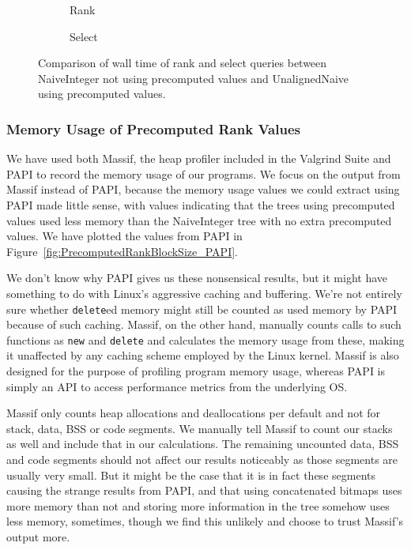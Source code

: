 \begin{figure}\tiny
	\begin{subfigure}{0.48\textwidth}
		
		\caption{Rank}
		\label{fig:PrecomputedRankBlockSize_vsNaiveInteger_Rank}
	\end{subfigure}
	\hfill
	\begin{subfigure}{0.48\textwidth}
		
		\caption{Select}
		\label{fig:PrecomputedRankBlockSize_vsNaiveInteger_Select}
	\end{subfigure}
	\caption{Comparison of wall time of rank and select queries between NaiveInteger not using precomputed values and UnalignedNaive using precomputed values.}
	\label{fig:PrecomputedRankBlockSize_vsNaiveInteger}
\end{figure}

\restoregeometry




\subsubsection{Memory Usage of Precomputed Rank Values}
We have used both Massif, the heap profiler included in the Valgrind Suite and PAPI to record the memory usage of our programs.
We focus on the output from Massif instead of PAPI, because the memory usage values we could extract using PAPI made little sense, with values indicating that the trees using precomputed values used less memory than the NaiveInteger tree with no extra precomputed values.
We have plotted the values from PAPI in Figure~\ref{fig:PrecomputedRankBlockSize_PAPI}.

We don't know why PAPI gives us these nonsensical results, but it might have something to do with Linux's aggressive caching and buffering.
We're not entirely sure whether \texttt{delete}ed memory might still be counted as used memory by PAPI because of such caching.
Massif, on the other hand, manually counts calls to such functions as \texttt{new} and \texttt{delete} and calculates the memory usage from these, making it unaffected by any caching scheme employed by the Linux kernel.
Massif is also designed for the purpose of profiling program memory usage, whereas PAPI is simply an API to access performance metrics from the underlying OS.

Massif only counts heap allocations and deallocations per default and not for stack, data, BSS or code segments.
We manually tell Massif to count our stacks as well and include that in our calculations.
The remaining uncounted data, BSS and code segments should not affect our results noticeably as those segments are usually very small.
But it might be the case that it is in fact these segments causing the strange results from PAPI, and that using concatenated bitmaps uses more memory than not and storing more information in the tree somehow uses less memory, sometimes, though we find this unlikely and choose to trust Massif's output more.

